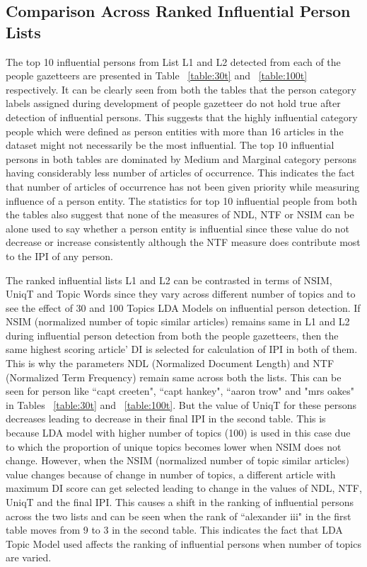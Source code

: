 \documentclass[10pt,journal,compsoc]{IEEEtran}
\begin{document}
\subsection{Comparison Across Ranked Influential Person Lists }

The top 10 influential persons from List L1 and L2 detected from each of the people gazetteers are presented in Table ~\ref{table:30t} and ~\ref{table:100t} respectively.
It can be clearly seen from both the tables that the person category labels assigned during development of people gazetteer do not hold true after detection of influential persons. This suggests that the highly influential category people which were defined as person entities with more than 16 articles in the dataset might not necessarily be the most influential. The top 10 influential persons in both tables are dominated by Medium and Marginal category persons having considerably less number of articles of occurrence. This indicates the fact that number of articles of occurrence has not been given priority while measuring influence of a person entity. 
The statistics for top 10 influential people from both the tables also suggest that none of the measures of NDL, NTF or NSIM can be alone used to say whether a person entity is influential since these value do not decrease or increase consistently although the NTF measure does contribute most to the IPI of any person.

The ranked influential lists L1 and L2 can be contrasted in terms of NSIM, UniqT and Topic Words since they vary across different number of topics and to see the effect of 30 and 100 Topics LDA Models on influential person detection.
 If NSIM (normalized number of topic similar articles) remains same in L1 and L2 during influential person detection from both the people gazetteers, then the same highest scoring article' DI is selected for calculation of IPI in both of them. This is why the parameters NDL (Normalized Document Length) and NTF (Normalized Term Frequency) remain same across both the lists. This can be seen for person like ``capt creeten", ``capt hankey", ``aaron trow" and "mrs oakes" in Tables ~\ref{table:30t} and ~\ref{table:100t}. But the value of UniqT for these persons decreases leading to decrease in their final IPI in the second table. This is because LDA model with higher number of topics (100) is used in this case due to which the proportion of unique topics becomes lower when NSIM does not change.
However, when the NSIM (normalized number of topic similar articles) value changes because of change in number of topics, a different article with maximum DI score can get selected leading to change in the values of NDL, NTF, UniqT and the final IPI. This causes a shift in the ranking of influential persons across the two lists and can be seen when the rank of ``alexander iii" in the first table moves from 9 to 3 in the second table. 
This indicates the fact that LDA Topic Model used affects the ranking of influential persons when number of topics are varied.
\end{document}
